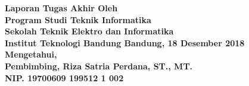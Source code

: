 \clearpage
\pagestyle{empty}

\begin{center}
\smallskip
    \Large \bfseries \MakeUppercase{\thetitle}
    \vfill
    \Large Laporan Tugas Akhir
    \vfill
    \large Oleh
    \Large \theauthor \\
    \large Program Studi Teknik Informatika \\ Sekolah Teknik Elektro dan Informatika \\ Institut Teknologi Bandung
    \vfill
    \vfill
    \vfill
    \large Bandung, 18 Desember 2018 \\
    \large Mengetahui, \\
    \large Pembimbing,
    \vfill
    \vfill
    \vfill
    \vfill
    \large Riza Satria Perdana, ST., MT. \\
    \large NIP. 19700609 199512 1 002
\end{center}
\clearpage
